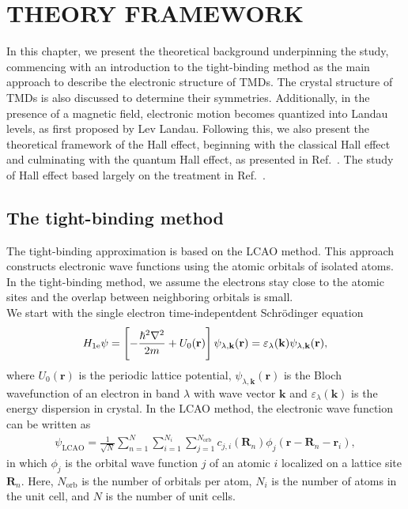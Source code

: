 \chapter{\textbf{THEORY FRAMEWORK}}
In this chapter, we present the theoretical background underpinning the study, commencing with an introduction to the tight-binding method as the main approach to describe the electronic structure of \acp{TMD}. The crystal structure of \acp{TMD} is also discussed to determine their symmetries. Additionally, in the presence of a magnetic field, electronic motion becomes quantized into Landau levels, as first proposed by Lev Landau. Following this, we also present the theoretical framework of the Hall effect, beginning with the classical Hall effect and culminating with the quantum Hall effect, as presented in Ref.~\cite{klitzing90}. The study of Hall effect based largely on the treatment in Ref.~\cite{xiao2010berry}.


\section{The tight-binding method}\label{Section 2.1}
The tight-binding approximation is based on the \ac{LCAO} method. This approach constructs electronic wave functions using the atomic orbitals of isolated atoms. In the tight-binding method, we assume the electrons stay close to the atomic sites and the overlap between neighboring orbitals is small.\\
We start with the single electron time-indepentdent Schr\"{o}dinger equation
\begin{gather}
	H_{\text{1e}} \psi = \left[-\dfrac{\hbar^{2} \nabla^{2}}{2m} + U_{0}(\mathbf{r})\right] \psi_{\lambda,\mathbf{k}}(\mathbf{r}) = \varepsilon_{\lambda}(\mathbf{k}) \psi_{\lambda,\mathbf{k}}(\mathbf{r}),
\end{gather}
where $U_{0}(\mathbf{r})$ is the periodic lattice potential, $\psi_{\lambda,\mathbf{k}}(\mathbf{r})$ is the Bloch wavefunction of an electron in band $\lambda$ with wave vector $\mathbf{k}$ and $\varepsilon_{\lambda}(\mathbf{k})$ is the energy dispersion in crystal. In the \ac{LCAO} method, the electronic wave function can be written as 
\begin{gather}
	\psi_{\text{LCAO}} = \frac{1}{\sqrt{N}}\sum_{n = 1}^{N} \sum_{i = 1}^{N_{i}} \sum_{j = 1}^{N_{\text{orb}}} c_{j,i}(\mathbf{R}_{n}) \phi_{j} (\mathbf{r} - \mathbf{R}_{n} - \mathbf{r}_{i}),
\end{gather}
in which $\phi_{j}$ is the orbital wave function $j$ of an atomic $i$ localized on a lattice site $\mathbf{R}_{n}$. Here, $ N_{\text{orb}} $ is the number of orbitals per atom, $ N_{i} $ is the number of atoms in the unit cell, and $ N $ is the number of unit cells.

